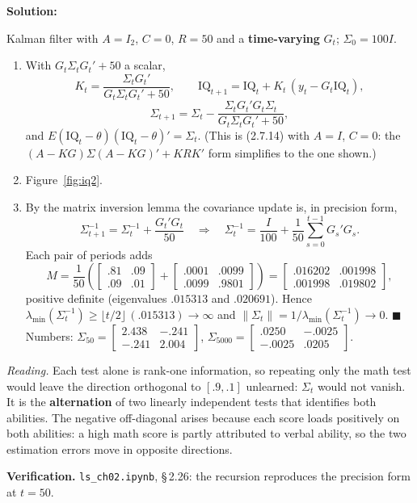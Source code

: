 \documentclass[12pt, letterpaper]{article}
\newcommand{\nb}[1]{\texttt{ls\_ch02.ipynb}, \S\,#1}
\begin{document}
\begin{tcolorbox}[evenbox,title={Exercise 2.26 \quad Math and Verbal IQ's}]
\textbf{Solution:}

Kalman filter with $A=I_2$, $C=0$, $R=50$ and a \textbf{time-varying} $G_t$; $\Sigma_0=100I$.
\begin{enumerate}
\item With $G_t\Sigma_tG_t'+50$ a scalar,
\[
K_t=\frac{\Sigma_tG_t'}{G_t\Sigma_tG_t'+50},\qquad
\text{IQ}_{t+1}=\text{IQ}_t+K_t\,(y_t-G_t\text{IQ}_t),
\]
\[
\Sigma_{t+1}=\Sigma_t-\frac{\Sigma_tG_t'G_t\Sigma_t}{G_t\Sigma_tG_t'+50},
\]
and $E(\text{IQ}_t-\theta)(\text{IQ}_t-\theta)'=\Sigma_t$. (This is (2.7.14) with $A=I$, $C=0$: the
$(A-KG)\Sigma(A-KG)'+KRK'$ form simplifies to the one shown.)
\item Figure~\ref{fig:iq2}.
\item By the matrix inversion lemma the covariance update is, in precision form,
\[
\Sigma_{t+1}^{-1}=\Sigma_t^{-1}+\frac{G_t'G_t}{50}\quad\Rightarrow\quad
\Sigma_t^{-1}=\frac{I}{100}+\frac1{50}\sum_{s=0}^{t-1}G_s'G_s .
\]
Each pair of periods adds
\[
M=\frac{1}{50}\left(\begin{bmatrix}.81&.09\\.09&.01\end{bmatrix}+\begin{bmatrix}.0001&.0099\\.0099&.9801\end{bmatrix}\right)
=\begin{bmatrix}.016202&.001998\\.001998&.019802\end{bmatrix},
\]
positive definite (eigenvalues $.015313$ and $.020691$). Hence
$\lambda_{\min}(\Sigma_t^{-1})\ge\lfloor t/2\rfloor\,(.015313)\to\infty$ and
$\|\Sigma_t\|=1/\lambda_{\min}(\Sigma_t^{-1})\to0$. $\blacksquare$ Numbers:
$\Sigma_{50}=\begin{bmatrix}2.438&-.241\\-.241&2.004\end{bmatrix}$,
$\Sigma_{5000}=\begin{bmatrix}.0250&-.0025\\-.0025&.0205\end{bmatrix}$.
\end{enumerate}
\emph{Reading.} Each test alone is rank-one information, so repeating only the math test would leave
the direction orthogonal to $[.9,.1]$ unlearned: $\Sigma_t$ would not vanish. It is the
\textbf{alternation} of two linearly independent tests that identifies both abilities. The negative
off-diagonal arises because each score loads positively on both abilities: a high math score is
partly attributed to verbal ability, so the two estimation errors move in opposite directions.

\textbf{Verification.} \nb{2.26}: the recursion reproduces the precision form at $t=50$. \checkmark
\end{tcolorbox}
\end{document}
